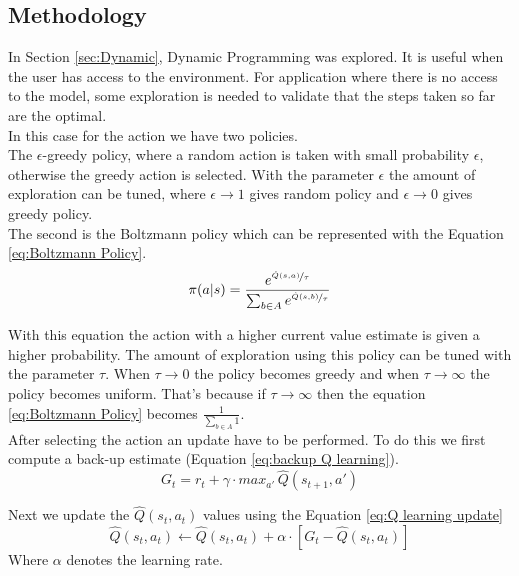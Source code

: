 \documentclass{article}
\begin{document}
\subsection{Methodology}
In Section \ref{sec:Dynamic}, Dynamic Programming was explored. It is useful when the user has access to the environment. For application 
where there is no access to the model, some exploration is needed to validate that the steps taken so far are the optimal. \\

In this case for the action we have two policies.\\
The $\epsilon$-greedy policy, where a random action is taken with small probability $\epsilon$, otherwise the greedy action is 
selected. With the parameter $\epsilon$ the amount of exploration can be tuned, where $\epsilon \rightarrow 1$ gives random policy
and $\epsilon \rightarrow 0$ gives greedy policy.\\
The second is the Boltzmann policy which can be represented with the Equation \ref{eq:Boltzmann Policy}.
\begin{equation}
    \label{eq:Boltzmann Policy}
    \pi(a|s) = \frac{e^{\nicefrac{\hat{Q}(s,a)}{\tau}}}{\sum_{b\in A}e^{\nicefrac{\hat{Q}(s,b)}{\tau}}}
\end{equation} 

With this equation the action with a higher current value estimate is given a higher probability.
The amount of exploration using this policy can be tuned with the parameter $\tau$. 
When $\tau \rightarrow 0$ the policy becomes greedy and when $\tau \rightarrow \infty$ the policy becomes uniform.
That's because if $\tau \rightarrow \infty$ then the equation \ref{eq:Boltzmann Policy} becomes
$\frac{1}{\sum_{b \in A}1}$. \\

After selecting the action an update have to be performed. To do this we first compute a back-up estimate (Equation \ref{eq:backup Q learning}).
\begin{equation}
    \label{eq:backup Q learning}
    G_t = r_t + \gamma \cdot max_{a'}\, \hat{Q}(s_{t+1}, a')
\end{equation}

Next we update the $\hat{Q}(s_t,a_t)$ values using the Equation \ref{eq:Q learning update}
\begin{equation}
    \label{eq:Q learning update}
    \hat{Q}(s_t,a_t) \leftarrow \hat{Q}(s_t,a_t) + \alpha \cdot [G_t - \hat{Q}(s_t,a_t)]
\end{equation}
Where $\alpha$ denotes the learning rate.\\
\end{document}

